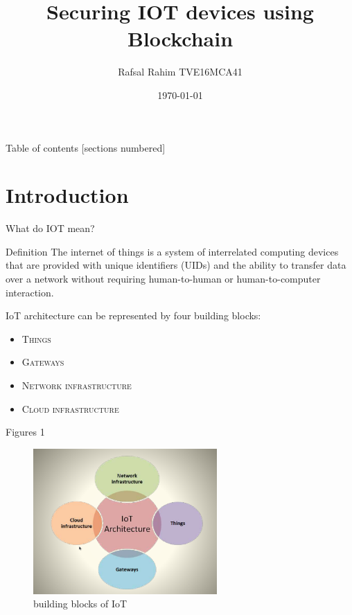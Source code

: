 \documentclass[10pt]{beamer}
\title{Securing IOT devices using Blockchain}
\date{\today}
\author{Rafsal Rahim \newline TVE16MCA41}
\institute{Dept. MCA, College of Engineering Trivandrum}
\begin{document}
\maketitle

\begin{frame}{Table of contents}
  [sections numbered]
  \tableofcontents[hideallsubsections]
\end{frame}

\section{Introduction}

\begin{frame}[fragile]{What do IOT  mean?}
      \begin{block}{Definition}
	The internet of things is a system of interrelated computing devices that are provided with unique identifiers (UIDs) and the ability to transfer data over a network without requiring human-to-human or human-to-computer interaction.
	\end{block}
	IoT architecture can be represented by four building blocks:
	\begin{itemize}
		\item \textsc{Things}
		\item \textsc{Gateways}
		\item \textsc{Network infrastructure}
		\item \textsc{Cloud infrastructure}
	\end{itemize}




\end{frame}

\begin{frame}{Figures 1}
  \begin{figure}  
	\includegraphics[width=7cm]{iot_struct}    
    \caption{building blocks of IoT}  \end{figure}
\end{frame}
\end{document}

